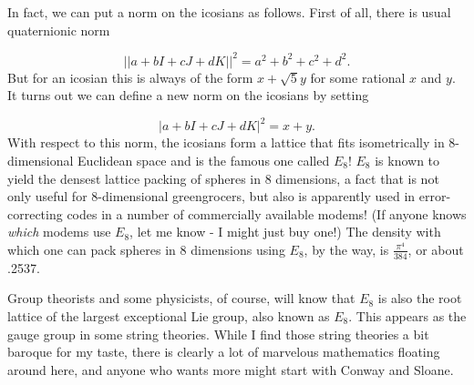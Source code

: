 In fact, we can put a norm on the icosians as follows. First of all, there is usual quaternionic norm

\[          ||a + bI + cJ + dK||^2 = a^2 + b^2 + c^2 + d^2. \]
But for an icosian this is always of the form $x + \sqrt{5} y$ for some rational $x$ and $y$. It turns out we can define a new norm on the icosians by setting

\[          |a + bI + cJ + dK|^2 = x + y.\]
With respect to this norm, the icosians form a lattice that fits isometrically in 8-dimensional Euclidean space and is the famous one called $E_8$! $E_8$ is known to yield the densest lattice packing of spheres in 8 dimensions, a fact that is not only useful for 8-dimensional greengrocers, but also is apparently used in error-correcting codes in a number of commercially available modems! (If anyone knows \emph{which} modems use $E_8$, let me know - I might just buy one!) The density with which one can pack spheres in 8 dimensions using $E_8$, by the way, is $\frac{\pi^4}{384}$, or about .2537.

Group theorists and some physicists, of course, will know that $E_8$ is also the root lattice of the largest exceptional Lie group, also known as $E_8$. This appears as the gauge group in some string theories. While I find those string theories a bit baroque for my taste, there is clearly a lot of marvelous mathematics floating around here, and anyone who wants more might start with Conway and Sloane.

\Addendum

